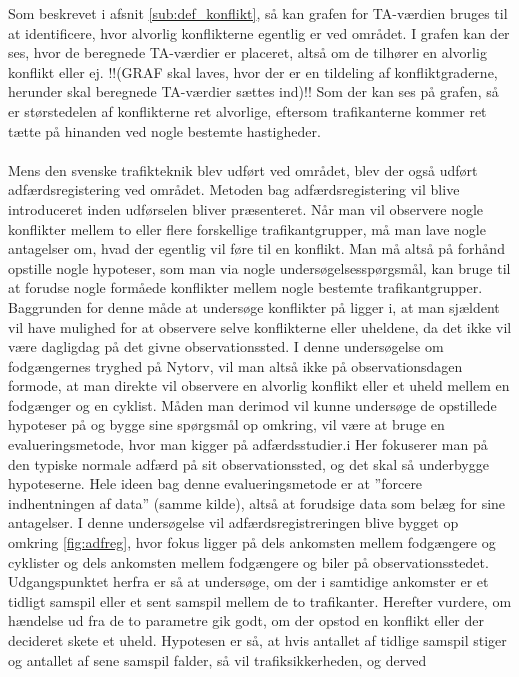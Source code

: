 Som beskrevet i afsnit \cref{sub:def_konflikt}, så kan grafen for TA-værdien bruges til at identificere, hvor alvorlig konflikterne egentlig er ved området. I grafen kan der ses, hvor de beregnede TA-værdier er placeret, altså om de tilhører en alvorlig konflikt eller ej.
!!(GRAF skal laves, hvor der er en tildeling af konfliktgraderne, herunder skal beregnede TA-værdier sættes ind)!!
Som der kan ses på grafen, så er størstedelen af konflikterne ret alvorlige, eftersom trafikanterne kommer ret tætte på hinanden ved nogle bestemte hastigheder.
\\\\
Mens den svenske trafikteknik blev udført ved området, blev der også udført adfærdsregistering ved området. Metoden bag adfærdsregistering vil blive introduceret inden udførselen bliver præsenteret.
Når	man	vil	observere nogle	konflikter mellem to eller flere	forskellige trafikantgrupper,	må man lave	nogle antagelser	om, hvad	 der egentlig vil føre til en konflikt. Man må altså	på	forhånd	opstille nogle hypoteser, som man via nogle undersøgelsesspørgsmål, kan bruge til	at forudse nogle	formåede	konflikter mellem nogle bestemte	trafikantgrupper.	Baggrunden for denne	måde at	undersøge konflikter	på ligger i,	at man sjældent 	vil	have	mulighed	 for at	observere selve konflikterne	eller uheldene, da det ikke	vil	være	 dagligdag på	 det	 givne observationssted.	I denne	undersøgelse om	fodgængernes tryghed på	Nytorv,	vil man altså ikke på observationsdagen formode,	at man direkte vil observere en alvorlig	 konflikt eller	et uheld mellem	en fodgænger og	en cyklist.	Måden man derimod	vil	kunne undersøge	de opstillede hypoteser på og bygge sine	spørgsmål op omkring, vil	være	at bruge en	evalueringsmetode, hvor	man	kigger på adfærdsstudier.i Her fokuserer	man	på den typiske normale adfærd på	sit observationssted, og	det skal så	underbygge	hypoteserne. Hele ideen bag denne evalueringsmetode er at ”forcere indhentningen af data”	(samme	kilde),	altså at forudsige data	som	belæg for sine antagelser.
I denne undersøgelse vil	adfærdsregistreringen blive bygget op omkring	 \cref{fig:adfreg},	hvor fokus ligger på dels ankomsten mellem fodgængere	 og cyklister og dels ankomsten mellem	fodgængere og biler på observationsstedet. Udgangspunktet herfra er så at	undersøge, om	der i samtidige ankomster er	et tidligt samspil eller	et sent samspil mellem de to trafikanter.
Herefter vurdere, om hændelse ud fra	de to parametre gik godt, om	der	opstod en konflikt	eller der decideret skete et	uheld. Hypotesen er	så,	at hvis	antallet	 af	tidlige
samspil stiger og antallet af sene samspil falder, så vil trafiksikkerheden, og derved
